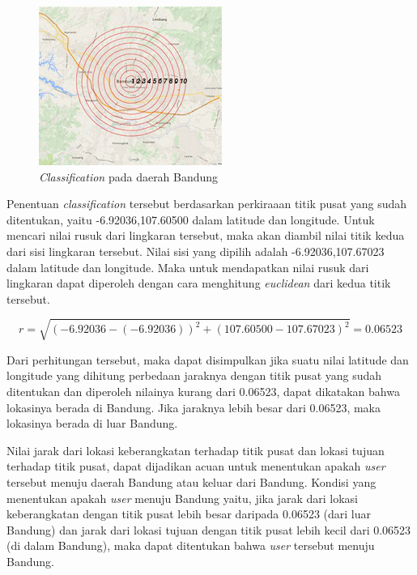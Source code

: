 \begin{figure}
\centering
\includegraphics[scale=1]{Gambar/classificationmap.jpg}
\caption[\textsl{Classification} pada daerah Bandung]{\textsl{Classification} pada daerah Bandung}
\label{fig:classificationMap} 
\end{figure}

Penentuan \textsl{classification} tersebut berdasarkan perkiraaan titik pusat yang sudah ditentukan, yaitu -6.92036,107.60500 dalam latitude dan longitude. Untuk mencari nilai rusuk dari lingkaran tersebut, maka akan diambil nilai titik kedua dari sisi lingkaran tersebut. Nilai sisi yang dipilih adalah -6.92036,107.67023 dalam latitude dan longitude. Maka untuk mendapatkan nilai rusuk dari lingkaran dapat diperoleh dengan cara menghitung \textsl{euclidean} dari kedua titik tersebut.

\begin{displaymath}
	r = \sqrt{(-6.92036 - (-6.92036))^{2} + (107.60500 - 107.67023)^{2}} = 0.06523
\end{displaymath}

Dari perhitungan tersebut, maka dapat disimpulkan jika suatu nilai latitude dan longitude yang dihitung perbedaan jaraknya dengan titik pusat yang sudah ditentukan dan diperoleh nilainya kurang dari 0.06523, dapat dikatakan bahwa lokasinya berada di Bandung. Jika jaraknya lebih besar dari 0.06523, maka lokasinya berada di luar Bandung.

Nilai jarak dari lokasi keberangkatan terhadap titik pusat dan lokasi tujuan terhadap titik pusat, dapat dijadikan acuan untuk menentukan apakah \textsl{user} tersebut menuju daerah Bandung atau keluar dari Bandung. Kondisi yang menentukan apakah \textsl{user} menuju Bandung yaitu, jika jarak dari lokasi keberangkatan dengan titik pusat lebih besar daripada 0.06523 (dari luar Bandung) dan jarak dari lokasi tujuan dengan titik pusat lebih kecil dari 0.06523 (di dalam Bandung), maka dapat ditentukan bahwa \textsl{user} tersebut menuju Bandung.

